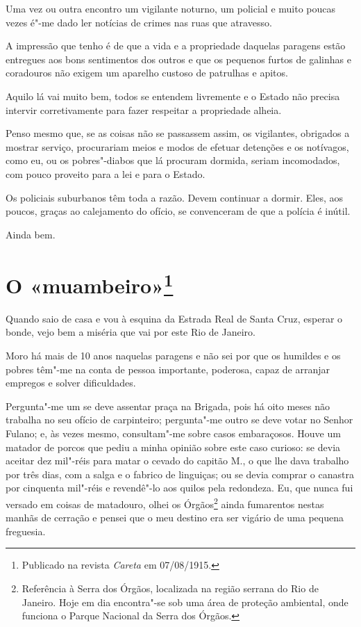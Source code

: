 Uma vez ou outra encontro um vigilante noturno, um policial e muito
poucas vezes é"-me dado ler notícias de crimes nas ruas que atravesso.

A impressão que tenho é de que a vida e a propriedade daquelas paragens
estão entregues aos bons sentimentos dos outros e que os pequenos furtos
de galinhas e coradouros não exigem um aparelho custoso de patrulhas e
apitos.

Aquilo lá vai muito bem, todos se entendem livremente e o Estado não
precisa intervir corretivamente para fazer respeitar a propriedade
alheia.

Penso mesmo que, se as coisas não se passassem assim, os vigilantes,
obrigados a mostrar serviço, procurariam meios e modos de efetuar
detenções e os notívagos, como eu, ou os pobres"-diabos que lá procuram
dormida, seriam incomodados, com pouco proveito para a lei e para o
Estado.

Os policiais suburbanos têm toda a razão. Devem continuar a dormir.
Eles, aos poucos, graças ao calejamento do ofício, se convenceram de que
a polícia é inútil.

Ainda bem.



\chapter[O «muambeiro»]{O «muambeiro»\footnote[*]{Publicado na revista \emph{Careta} em 07/08/1915.}}

Quando saio de casa e vou à esquina da Estrada Real de Santa Cruz,
esperar o bonde, vejo bem a miséria que vai por este Rio de Janeiro.

Moro há mais de 10 anos naquelas paragens e não sei por que os humildes
e os pobres têm"-me na conta de pessoa importante, poderosa, capaz de
arranjar empregos e solver dificuldades.

Pergunta"-me um se deve assentar praça na Brigada, pois há oito meses não
trabalha no seu ofício de carpinteiro; pergunta"-me outro se deve votar
no Senhor Fulano; e, às vezes mesmo, consultam"-me sobre casos
embaraçosos. Houve um matador de porcos que pediu a minha opinião sobre
este caso curioso: se devia aceitar dez mil"-réis para matar o cevado do
capitão M., o que lhe dava trabalho por três dias, com a salga e o
fabrico de linguiças; ou se devia comprar o canastra por cinquenta
mil"-réis e revendê"-lo aos quilos pela redondeza. Eu, que nunca fui
versado em coisas de matadouro, olhei os Órgãos\footnote{Referência à
  Serra dos Órgãos, localizada na região serrana do Rio de Janeiro. Hoje
  em dia encontra"-se sob uma área de proteção ambiental, onde funciona o
  Parque Nacional da Serra dos Órgãos.} ainda fumarentos nestas manhãs
de cerração e pensei que o meu destino era ser vigário de uma pequena
freguesia.

